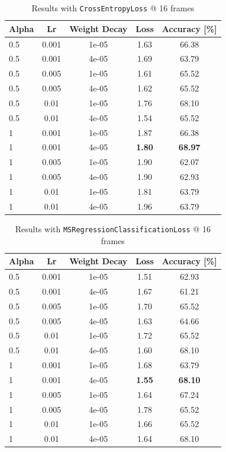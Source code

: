 \documentclass[10pt,twocolumn,letterpaper]{article}
\begin{document}
\begin{table}[h!]
	\begin{center}
		\begin{tabular}{lcc|cc}
			\textbf{Alpha} & \textbf{Lr} & \textbf{Weight Decay} & \textbf{Loss} & \textbf{Accuracy [\%]}\\
			\hline
			0.5&0.001&1e-05&1.63&66.38\\
			0.5&0.001&4e-05&1.69&63.79\\
			0.5&0.005&1e-05&1.61&65.52\\
			0.5&0.005&4e-05&1.62&65.52\\
			0.5&0.01&1e-05&1.76&68.10\\
			0.5&0.01&4e-05&1.54&65.52\\
			1&0.001&1e-05&1.87&66.38\\
			1&0.001&4e-05&\textbf{1.80}&\textbf{68.97}\\
			1&0.005&1e-05&1.90&62.07\\
			1&0.005&4e-05&1.90&62.93\\
			1&0.01&1e-05&1.81&63.79\\
			1&0.01&4e-05&1.96&63.79\\
			\hline
		\end{tabular}
	\end{center}	
	\caption{Results with \texttt{CrossEntropyLoss} @ 16 frames}
\end{table}

\begin{table}[h!]
	\begin{center}
		\begin{tabular}{lcc|cc}
			\textbf{Alpha} & \textbf{Lr} & \textbf{Weight Decay} & \textbf{Loss} & \textbf{Accuracy [\%]}\\
			\hline
			0.5&0.001&1e-05&1.51&62.93\\
			0.5&0.001&4e-05&1.67&61.21\\
			0.5&0.005&1e-05&1.70&65.52\\
			0.5&0.005&4e-05&1.63&64.66\\
			0.5&0.01&1e-05&1.72&65.52\\
			0.5&0.01&4e-05&1.60&68.10\\
			1&0.001&1e-05&1.68&63.79\\
			1&0.001&4e-05&\textbf{1.55}&\textbf{68.10}\\
			1&0.005&1e-05&1.64&67.24\\
			1&0.005&4e-05&1.78&65.52\\
			1&0.01&1e-05&1.66&65.52\\
			1&0.01&4e-05&1.64&68.10\\
			\hline
		\end{tabular}
	\end{center}	
	\caption{Results with \texttt{MSRegressionClassificationLoss} @ 16 frames}
\end{table}
\end{document}
